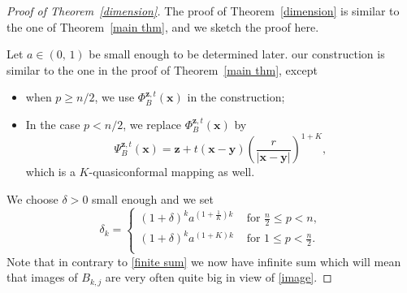 \documentclass[reqno,11pt]{amsart}
\numberwithin{equation}{section}
\theoremstyle{remark}
\begin{document}
\begin{proof}[Proof of Theorem~\ref{dimension}]
The proof of Theorem~\ref{dimension} is similar to the one of Theorem~\ref{main thm}, and we sketch the proof here. 

Let $a\in (0,\,1)$ be small enough to be determined later. our construction is similar to the one in the proof of Theorem~\ref{main thm}, except
\begin{itemize}
    \item when $p\geq n/2$, we use $\Phi_{B}^{\mathbf z,t}(\mathbf x)$ in the construction; 
\item In the case $p<n/2$, 
we replace $\Phi_{B}^{\mathbf z,t}(\mathbf x)$ by 
    $$\Psi^{\mathbf z,t}_B(\mathbf x)=\mathbf z+ t(\mathbf x-\mathbf y)\left(\frac{r}{|\mathbf x-\mathbf y|}\right)^{1+ K},$$
which is a $K$-quasiconformal mapping as well.
\end{itemize}
 

We choose $\delta>0$ small enough and we set 
\begin{equation}\label{choosedelta}
\delta_k=\begin{cases}
(1+\delta)^k a^{(1+\frac{1}{K})k} &\text{ for }\frac{n}{2}\leq p< n ,\\
(1+\delta)^k a^{(1+K)k} &\text{ for }1\leq p< \frac{n}{2}.\\
\end{cases}
\end{equation}
Note that in contrary to \eqref{finite sum} we now have infinite sum which will mean that images of $B_{k,j}$ are very often quite big in view of \eqref{image}. 


\end{proof}
\end{document}

